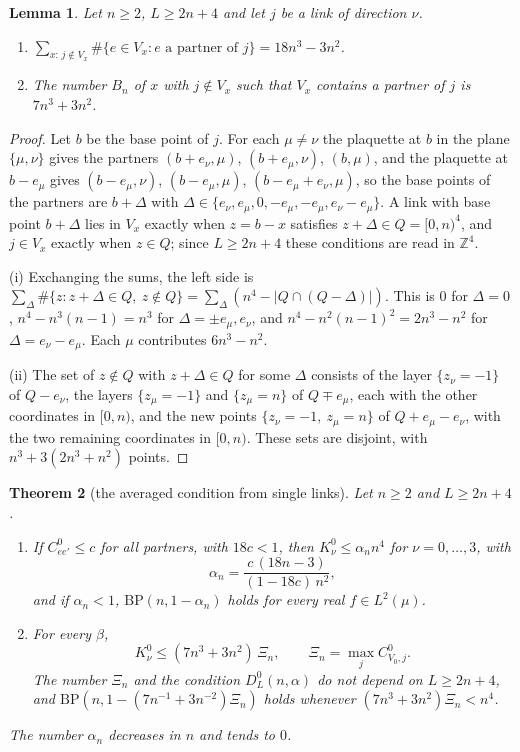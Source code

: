 \documentclass[aps,prd,twocolumn,superscriptaddress,nofootinbib,longbibliography,floatfix,amsmath,amssymb,10pt]{revtex4-2}
\newtheorem{theorem}{Theorem}
\newtheorem{lemma}[theorem]{Lemma}
\theoremstyle{definition}
\theoremstyle{remark}
\newcommand{\Z}{\mathbb{Z}}
\begin{document}
\begin{lemma}\label{lem:bpcount}
Let $n\ge2$, $L\ge2n+4$ and let $j$ be a link of direction $\nu$.
\begin{enumerate}[label=\textup{(\roman*)},leftmargin=*]
\item $\sum_{x:\,j\notin V_x}\#\{e\in V_x:e\text{ a partner of }j\}=18n^3-
3n^2$.
\item The number $B_n$ of $x$ with $j\notin V_x$ such that $V_x$ contains
a partner of $j$ is $7n^3+3n^2$.
\end{enumerate}
\end{lemma}

\begin{proof}
Let $b$ be the base point of $j$. For each $\mu\ne\nu$ the plaquette at $b$
in the plane $\{\mu,\nu\}$ gives the partners $(b+e_\nu,\mu)$, $(b+e_\mu,
\nu)$, $(b,\mu)$, and the plaquette at $b-e_\mu$ gives $(b-e_\mu,\nu)$,
$(b-e_\mu,\mu)$, $(b-e_\mu+e_\nu,\mu)$, so the base points of the partners
are $b+\Delta$ with $\Delta\in\{e_\nu,e_\mu,0,-e_\mu,-e_\mu,e_\nu-e_\mu\}$.
A link with base point $b+\Delta$ lies in $V_x$ exactly when $z=b-x$
satisfies $z+\Delta\in Q=[0,n)^4$, and $j\in V_x$ exactly when $z\in Q$;
since $L\ge2n+4$ these conditions are read in $\Z^4$.

(i) Exchanging the sums, the left side is $\sum_\Delta\#\{z:z+\Delta\in Q,\
z\notin Q\}=\sum_\Delta(n^4-\lvert Q\cap(Q-\Delta)\rvert)$. This is $0$ for
$\Delta=0$, $n^4-n^3(n-1)=n^3$ for $\Delta=\pm e_\mu,e_\nu$, and $n^4-n^2
(n-1)^2=2n^3-n^2$ for $\Delta=e_\nu-e_\mu$. Each $\mu$ contributes $6n^3-n^2$.

(ii) The set of $z\notin Q$ with $z+\Delta\in Q$ for some $\Delta$ consists
of the layer $\{z_\nu=-1\}$ of $Q-e_\nu$, the layers $\{z_\mu=-1\}$ and
$\{z_\mu=n\}$ of $Q\mp e_\mu$, each with the other coordinates in $[0,n)$,
and the new points $\{z_\nu=-1,\ z_\mu=n\}$ of $Q+e_\mu-e_\nu$, with the two
remaining coordinates in $[0,n)$. These sets are disjoint, with
$n^3+3(2n^3+n^2)$ points.
\end{proof}

\begin{theorem}[the averaged condition from single links]\label{thm:bpstrong}
Let $n\ge2$ and $L\ge2n+4$.
\begin{enumerate}[label=\textup{(\roman*)},leftmargin=*]
\item If $C^0_{ee'}\le c$ for all partners, with $18c<1$, then
$K^0_\nu\le\alpha_n n^4$ for $\nu=0,\dots,3$, with
\[
\alpha_n=\frac{c\,(18n-3)}{(1-18c)\,n^2},
\]
and if $\alpha_n<1$, $\mathrm{BP}(n,1-\alpha_n)$ holds for every real
$f\in L^2(\mu)$.
\item For every $\beta$,
\[
K^0_\nu\le(7n^3+3n^2)\,\Xi_n,\qquad\Xi_n=\max_jC^0_{V_0,j}.
\]
The number $\Xi_n$ and the condition $D^0_L(n,\alpha)$ do not
depend on $L\ge2n+4$, and $\mathrm{BP}(n,1-(7n^{-1}+3n^{-2})\Xi_n)$ holds
whenever $(7n^3+3n^2)\Xi_n<n^4$.
\end{enumerate}
The number $\alpha_n$ decreases in $n$ and tends to $0$.
\end{theorem}
\end{document}
